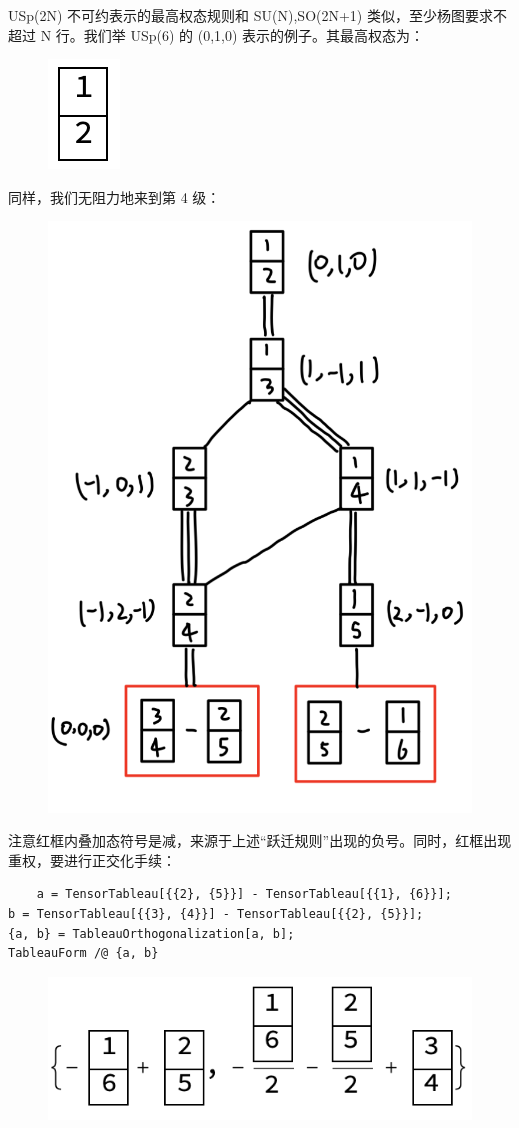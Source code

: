 \documentclass[UTF8]{ctexart}
\begin{document}
\noindent USp(2N) 不可约表示的最高权态规则和 SU(N),SO(2N+1) 类似，至少杨图要求不超过 N 行。我们举 USp(6) 的 (0,1,0) 表示的例子。其最高权态为：

\begin{figure}[H]
\begin{centering}
\includegraphics[width=0.06\linewidth]{include/Y11}
\par\end{centering}
\end{figure}

\noindent 同样，我们无阻力地来到第 4 级：

\begin{figure}[H]
\begin{centering}
\includegraphics[width=0.5\linewidth]{include/T10}
\par\end{centering}
\end{figure}

\noindent 注意红框内叠加态符号是减，来源于上述“跃迁规则”出现的负号。同时，红框出现重权，要进行正交化手续：

\begin{verbatim}
	a = TensorTableau[{{2}, {5}}] - TensorTableau[{{1}, {6}}];
b = TensorTableau[{{3}, {4}}] - TensorTableau[{{2}, {5}}];
{a, b} = TableauOrthogonalization[a, b];
TableauForm /@ {a, b}
\end{verbatim}

\begin{figure}[H]
\begin{centering}
\includegraphics[width=0.5\linewidth]{include/O21}
\par\end{centering}
\end{figure}
\end{document}
